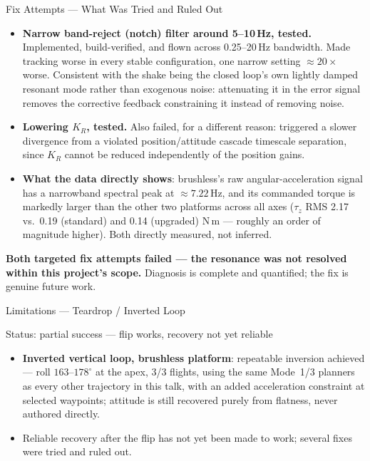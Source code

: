 \documentclass[aspectratio=169,11pt]{beamer}
\begin{document}
\begin{frame}{Fix Attempts --- What Was Tried and Ruled Out}
\begin{small}
\begin{itemize}
  \setlength{\itemsep}{0.15cm}
  \item \textbf{Narrow band-reject (notch) filter around 5--10\,Hz, tested.} Implemented,
        build-verified, and flown across 0.25--20\,Hz bandwidth. Made tracking worse in every
        stable configuration, one narrow setting $\approx20\times$ worse. Consistent with the
        shake being the closed loop's own lightly damped resonant mode rather than exogenous
        noise: attenuating it in the error signal removes the corrective feedback constraining
        it instead of removing noise.
  \item \textbf{Lowering $K_R$, tested.} Also failed, for a different reason: triggered a slower
        divergence from a violated position/attitude cascade timescale separation, since $K_R$
        cannot be reduced independently of the position gains.
  \item \textbf{What the data directly shows}: brushless's raw angular-acceleration signal has a
        narrowband spectral peak at $\approx7.22$\,Hz, and its commanded torque is markedly
        larger than the other two platforms across all axes ($\tau_z$ RMS 2.17 vs.\ 0.19
        (standard) and 0.14 (upgraded) N\,m --- roughly an order of magnitude higher). Both
        directly measured, not inferred.
\end{itemize}
\end{small}
{\footnotesize\textbf{Both targeted fix attempts failed --- the resonance was not resolved
within this project's scope.} Diagnosis is complete and quantified; the fix is genuine future
work.}
\end{frame}

\begin{frame}{Limitations --- Teardrop / Inverted Loop}
\begin{block}{Status: partial success --- flip works, recovery not yet reliable}
\begin{itemize}
  \setlength{\itemsep}{0.4cm}
  \item \textbf{Inverted vertical loop, brushless platform}: repeatable inversion achieved ---
        roll $163$--$178^\circ$ at the apex, 3/3 flights, using the same Mode~1/3 planners as
        every other trajectory in this talk, with an added acceleration constraint at selected
        waypoints; attitude is still recovered purely from flatness, never authored directly.
  \item Reliable recovery after the flip has not yet been made to work; several fixes were tried
        and ruled out.
\end{itemize}
\end{block}
\end{frame}
\end{document}
